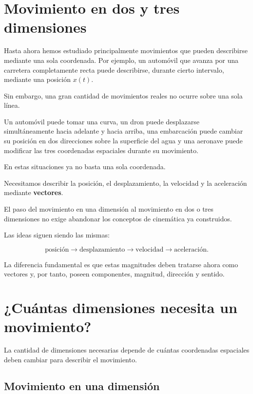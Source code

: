 \section{Movimiento en dos y tres dimensiones}

Hasta ahora hemos estudiado principalmente movimientos que pueden describirse
mediante una sola coordenada. Por ejemplo, un automóvil que avanza por una
carretera completamente recta puede describirse, durante cierto intervalo,
mediante una posición \(x(t)\).

Sin embargo, una gran cantidad de movimientos reales no ocurre sobre una sola
línea.

Un automóvil puede tomar una curva, un dron puede desplazarse simultáneamente
hacia adelante y hacia arriba, una embarcación puede cambiar su posición en dos
direcciones sobre la superficie del agua y una aeronave puede modificar las tres
coordenadas espaciales durante su movimiento.

En estas situaciones ya no basta una sola coordenada.

Necesitamos describir la posición, el desplazamiento, la velocidad y la
aceleración mediante \textbf{vectores}.

\begin{idea}
El paso del movimiento en una dimensión al movimiento en dos o tres dimensiones
no exige abandonar los conceptos de cinemática ya construidos.

Las ideas siguen siendo las mismas:

\[
\text{posición}
\longrightarrow
\text{desplazamiento}
\longrightarrow
\text{velocidad}
\longrightarrow
\text{aceleración}.
\]

La diferencia fundamental es que estas magnitudes deben tratarse ahora como
vectores y, por tanto, poseen componentes, magnitud, dirección y sentido.
\end{idea}


\section{¿Cuántas dimensiones necesita un movimiento?}

La cantidad de dimensiones necesarias depende de cuántas coordenadas espaciales
deben cambiar para describir el movimiento.

\subsection{Movimiento en una dimensión}

